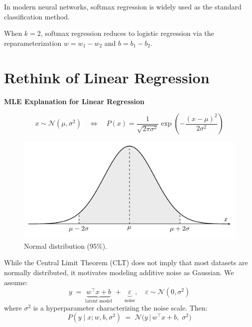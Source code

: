 \documentclass[../main]{subfiles}
\begin{document}
\begin{note}
  In modern neural networks, softmax regression is widely used 
  as the standard classification method.
\end{note}

\begin{remark}
  When $k=2$, softmax regression reduces to logistic regression 
  via the reparameterization $w = w_1 - w_2$ and $b = b_1 - b_2$.
\end{remark}
\section{Rethink of Linear Regression}
\begin{example}
  \textbf{MLE Explanation for Linear Regression}
\end{example}
\begin{definition}
    \begin{equation}
        x\sim\mathcal N(\mu,\sigma^2)\quad\Leftrightarrow\quad P(x)=\frac{1}{\sqrt{2\pi\sigma^2}}\exp\left(-\frac{(x-\mu)^2}{2\sigma^2}\right)
    \end{equation}
\end{definition}
\begin{figure}[H]
  \centering
  \includegraphics{../../tikz/2/3.pdf}
  \caption{Normal distribution (95\%).}
  \label{2-lr}
\end{figure}
While the Central Limit Theorem (CLT) does not imply that most datasets are normally distributed, 
it motivates modeling additive noise as Gaussian. We assume:
\begin{equation}
  y \;=\;
  \underbrace{w^\top x + b}_{\text{latent model}}
  \;+\;
  \underbrace{\varepsilon}_{\text{noise}},
  \quad \varepsilon \sim \mathcal N(0,\sigma^2)
\end{equation}
where $\sigma^2$ is a hyperparameter characterizing the noise scale. Then:
\begin{equation}
  P(y \mid x; w,b,\sigma^2) \;=\; \mathcal N\!\big(y \,\big|\, w^\top x + b,\; \sigma^2\big)
\end{equation}
\end{document}
